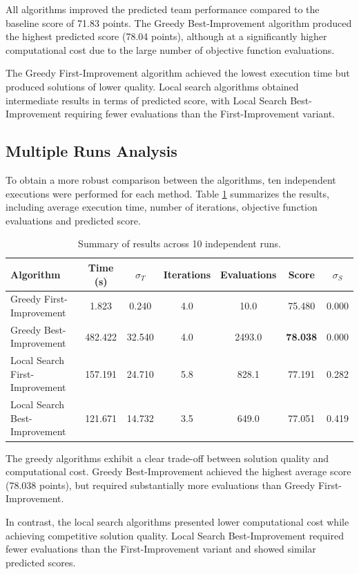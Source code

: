 \documentclass[a4paper,fleqn]{cas-sc}
\begin{document}
All algorithms improved the predicted team performance compared to the baseline score of 71.83 points. The Greedy Best-Improvement algorithm
produced the highest predicted score (78.04 points), although at a significantly higher computational cost due to the large number of objective function evaluations.

The Greedy First-Improvement algorithm achieved the lowest execution time but produced solutions of lower quality. Local search algorithms
obtained intermediate results in terms of predicted score, with Local Search Best-Improvement requiring fewer evaluations than the First-Improvement variant.

\subsection{Multiple Runs Analysis}

To obtain a more robust comparison between the algorithms, ten independent executions were performed for each method. Table \ref{tab:benchmark_multiple_runs} 
summarizes the results, including average execution time, number of iterations, objective function evaluations and predicted score.

\begin{table}[htbp]
\centering
\caption{Summary of results across 10 independent runs.}
\label{tab:benchmark_multiple_runs}
\begin{tabular}{lcccccc}
\toprule
Algorithm & Time (s) & $\sigma_T$ & Iterations & Evaluations & Score & $\sigma_S$ \\
\midrule
Greedy First-Improvement       & 1.823   & 0.240  & 4.0 & 10.0   & 75.480 & 0.000 \\
Greedy Best-Improvement        & 482.422 & 32.540 & 4.0 & 2493.0 & \textbf{78.038} & 0.000 \\
Local Search First-Improvement & 157.191 & 24.710 & 5.8 & 828.1  & 77.191 & 0.282 \\
Local Search Best-Improvement  & 121.671 & 14.732 & 3.5 & 649.0  & 77.051 & 0.419 \\
\bottomrule
\end{tabular}
\end{table}

The greedy algorithms exhibit a clear trade-off between solution quality and computational cost. Greedy Best-Improvement achieved the highest
average score (78.038 points), but required substantially more evaluations than Greedy First-Improvement.

In contrast, the local search algorithms presented lower computational cost while achieving competitive solution quality. Local Search
Best-Improvement required fewer evaluations than the First-Improvement variant and showed similar predicted scores.
\end{document}
